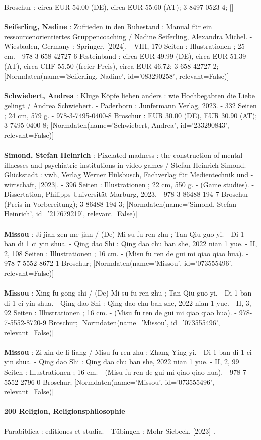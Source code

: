 \documentclass{article}
\begin{document}
\begin{multicols}{3}
Broschur : circa EUR 54.00 (DE), circa EUR 55.60 (AT); 3-8497-0523-4; []\\\\\textbf{Seiferling, Nadine} : Zufrieden in den Ruhestand : Manual für ein ressourcenorientiertes Gruppencoaching / Nadine Seiferling, Alexandra Michel. - Wiesbaden, Germany : Springer, [2024]. - VIII, 170 Seiten : Illustrationen ; 25 cm. - 978-3-658-42727-6 Festeinband : circa EUR 49.99 (DE), circa EUR 51.39 (AT), circa CHF 55.50 (freier Preis), circa EUR 46.72; 3-658-42727-2; [Normdaten(name='Seiferling, Nadine', id='083290258', relevant=False)]\\\\\textbf{Schwiebert, Andrea} : Kluge Köpfe lieben anders : wie Hochbegabten die Liebe gelingt / Andrea Schwiebert. - Paderborn : Junfermann Verlag, 2023. - 332 Seiten ; 24 cm, 579 g. - 978-3-7495-0400-8 Broschur : EUR 30.00 (DE), EUR 30.90 (AT); 3-7495-0400-8; [Normdaten(name='Schwiebert, Andrea', id='233290843', relevant=False)]\\\\\textbf{Simond, Stefan Heinrich} : Pixelated madness : the construction of mental illnesses and psychiatric institutions in video games / Stefan Heinrich Simond. - Glückstadt : vwh, Verlag Werner Hülsbusch, Fachverlag für Medientechnik und -wirtschaft, [2023]. - 396 Seiten : Illustrationen ; 22 cm, 550 g. - (Game studies). - Dissertation, Philipps-Universität Marburg, 2023. - 978-3-86488-194-7 Broschur (Preis in Vorbereitung); 3-86488-194-3; [Normdaten(name='Simond, Stefan Heinrich', id='217679219', relevant=False)]\\\\\textbf{Missou} : Ji jian zen me jian / (De) Mi su fu ren zhu ; Tan Qiu guo yi. - Di 1 ban di 1 ci yin shua. - Qing dao Shi : Qing dao chu ban she, 2022 nian 1 yue. - II, 2, 108 Seiten : Illustrationen ; 16 cm. - (Misu fu ren de gui mi qiao qiao hua). - 978-7-5552-8672-1 Broschur; [Normdaten(name='Missou', id='073555496', relevant=False)]\\\\\textbf{Missou} : Xing fu gong shi / (De) Mi su fu ren zhu ; Tan Qiu guo yi. - Di 1 ban di 1 ci yin shua. - Qing dao Shi : Qing dao chu ban she, 2022 nian 1 yue. - II, 3, 92 Seiten : Illustrationen ; 16 cm. - (Misu fu ren de gui mi qiao qiao hua). - 978-7-5552-8720-9 Broschur; [Normdaten(name='Missou', id='073555496', relevant=False)]\\\\\textbf{Missou} : Zi xin de li liang / Misu fu ren zhu ; Zhang Ying yi. - Di 1 ban di 1 ci yin shua. - Qing dao Shi : Qing dao chu ban she, 2022 nian 1 yue. - II, 2, 99 Seiten : Illustrationen ; 16 cm. - (Misu fu ren de gui mi qiao qiao hua). - 978-7-5552-2796-0 Broschur; [Normdaten(name='Missou', id='073555496', relevant=False)]\\\\\textbf{200 Religion, Religionsphilosophie}\\\\Parabiblica : editiones et studia. - Tübingen : Mohr Siebeck, [2023]-. - 
\end{multicols}
\end{document}
